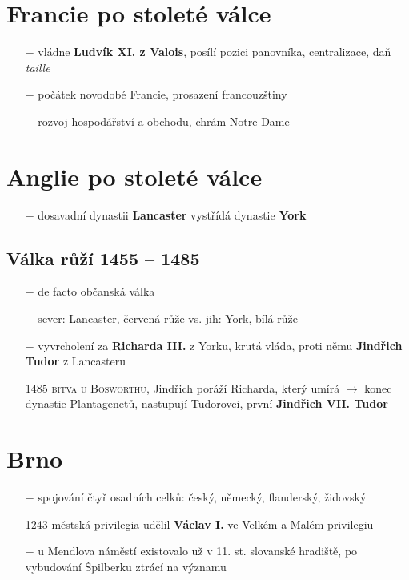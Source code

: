 \documentclass{article}
\begin{document}
\section*{Francie po stoleté válce}
\begin{itemize}
    \vspace{-0.5em}
    \setlength\itemsep{0.15em}
    \item[$-$] vládne \textbf{Ludvík XI. z Valois}, posílí pozici panovníka, centralizace, daň \textit{taille}
    \item[$-$] počátek novodobé Francie, prosazení francouzštiny
    \item[$-$]rozvoj hospodářství a obchodu, chrám Notre Dame
\end{itemize}


\section*{Anglie po stoleté válce}
\begin{itemize}
    \vspace{-0.5em}
    \setlength\itemsep{0.15em}
    \item[$-$] dosavadní dynastii \textbf{Lancaster} vystřídá dynastie \textbf{York}
\end{itemize}

\subsection*{Válka růží 1455 -- 1485}
\begin{itemize}
    \vspace{-0.5em}
    \setlength\itemsep{0.15em}
    \item[$-$] de facto občanská válka
    \item[$-$] sever: Lancaster, červená růže vs. jih: York, bílá růže
    \item[$-$] vyvrcholení za \textbf{Richarda III.} z Yorku, krutá vláda, proti němu \textbf{Jindřich Tudor} z Lancasteru
    \item[1485] \textsc{bitva u Bosworthu}, Jindřich poráží Richarda, který umírá $\rightarrow$ konec dynastie Plantagenetů, nastupují Tudorovci, první \textbf{Jindřich VII. Tudor}
\end{itemize}


\section*{Brno}
\begin{itemize}
    \vspace{-0.5em}
    \setlength\itemsep{0.15em}
    \item[$-$] spojování čtyř osadních celků: český, německý, flanderský, židovský
    \item[1243] městská privilegia udělil \textbf{Václav I.} ve Velkém a Malém privilegiu
    \item[$-$] u Mendlova náměstí existovalo už v 11. st. slovanské hradiště, po vybudování Špilberku ztrácí na významu
\end{itemize}
\end{document}

